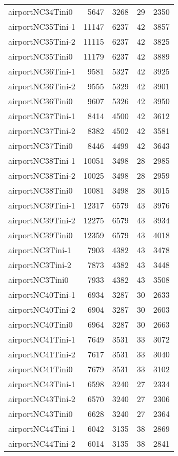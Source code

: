 \begin{longtable}{lrrrr}
airportNC34Tini0 & 5647 & 3268 & 29 & 2350 \\
airportNC35Tini-1 & 11147 & 6237 & 42 & 3857 \\
airportNC35Tini-2 & 11115 & 6237 & 42 & 3825 \\
airportNC35Tini0 & 11179 & 6237 & 42 & 3889 \\
airportNC36Tini-1 & 9581 & 5327 & 42 & 3925 \\
airportNC36Tini-2 & 9555 & 5329 & 42 & 3901 \\
airportNC36Tini0 & 9607 & 5326 & 42 & 3950 \\
airportNC37Tini-1 & 8414 & 4500 & 42 & 3612 \\
airportNC37Tini-2 & 8382 & 4502 & 42 & 3581 \\
airportNC37Tini0 & 8446 & 4499 & 42 & 3643 \\
airportNC38Tini-1 & 10051 & 3498 & 28 & 2985 \\
airportNC38Tini-2 & 10025 & 3498 & 28 & 2959 \\
airportNC38Tini0 & 10081 & 3498 & 28 & 3015 \\
airportNC39Tini-1 & 12317 & 6579 & 43 & 3976 \\
airportNC39Tini-2 & 12275 & 6579 & 43 & 3934 \\
airportNC39Tini0 & 12359 & 6579 & 43 & 4018 \\
airportNC3Tini-1 & 7903 & 4382 & 43 & 3478 \\
airportNC3Tini-2 & 7873 & 4382 & 43 & 3448 \\
airportNC3Tini0 & 7933 & 4382 & 43 & 3508 \\
airportNC40Tini-1 & 6934 & 3287 & 30 & 2633 \\
airportNC40Tini-2 & 6904 & 3287 & 30 & 2603 \\
airportNC40Tini0 & 6964 & 3287 & 30 & 2663 \\
airportNC41Tini-1 & 7649 & 3531 & 33 & 3072 \\
airportNC41Tini-2 & 7617 & 3531 & 33 & 3040 \\
airportNC41Tini0 & 7679 & 3531 & 33 & 3102 \\
airportNC43Tini-1 & 6598 & 3240 & 27 & 2334 \\
airportNC43Tini-2 & 6570 & 3240 & 27 & 2306 \\
airportNC43Tini0 & 6628 & 3240 & 27 & 2364 \\
airportNC44Tini-1 & 6042 & 3135 & 38 & 2869 \\
airportNC44Tini-2 & 6014 & 3135 & 38 & 2841 \\

\end{longtable}
